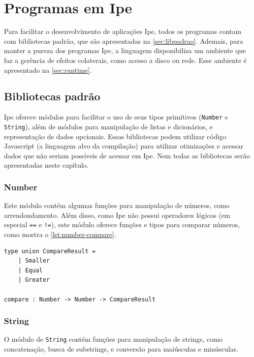 
\chapter{Programas em Ipe}\label{chapter:programas-em-ipe}

Para facilitar o desenvolvimento de aplicações Ipe, todos os programas contam com
bibliotecas padrão, que são apresentadas na \autoref{sec:libpadrao}. Ademais, para
manter a pureza dos programas Ipe, a linguagem disponibiliza um ambiente que
faz a gerência de efeitos colaterais, como acesso a disco ou rede. Esse ambiente
é apresentado na \autoref{sec:runtime}.

\section{Bibliotecas padrão}\label{sec:libpadrao}

Ipe oferece módulos para facilitar o uso de seus tipos primitivos (\texttt{Number}
e \texttt{String}), além de módulos para manipulação de listas e dicionários, e
representação de dados opcionais. Essas bibliotecas podem utilizar código Javascript
(a linguagem alvo da compilação) para utilizar otimizações e acessar dados que
não seriam possíveis de acessar em Ipe. Nem todas as bibliotecas serão apresentadas
neste capítulo.

\subsection{Number}

Este módulo contém algumas funções para manipulação de números, como arrendondamento.
Além disso, como Ipe não possui operadores lógicos (em especial \texttt{==} e \texttt{!=}),
este módulo oferece funções e tipos para comparar números, como mostra o \autoref{lst:number-compare}.

\begin{lstlisting}[label={lst:number-compare},caption={Comparação de números em Ipe}]
type union CompareResult =
    | Smaller
    | Equal
    | Greater

compare : Number -> Number -> CompareResult
\end{lstlisting}

\subsection{String}

O módulo de \texttt{String} contém funções para manipulação de strings, como
concatenação, busca de substrings, e conversão para maiúsculas e minúsculas.

